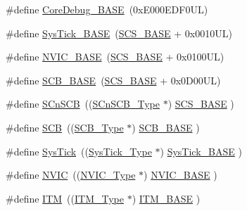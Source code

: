\begin{DoxyCompactItemize}
\item 
\#define \hyperlink{group___c_m_s_i_s__core__base_ga680604dbcda9e9b31a1639fcffe5230b}{Core\+Debug\+\_\+\+B\+A\+SE}~(0x\+E000\+E\+D\+F0\+U\+L)
\item 
\#define \hyperlink{group___c_m_s_i_s__core__base_ga58effaac0b93006b756d33209e814646}{Sys\+Tick\+\_\+\+B\+A\+SE}~(\hyperlink{group___c_m_s_i_s__core__base_ga3c14ed93192c8d9143322bbf77ebf770}{S\+C\+S\+\_\+\+B\+A\+SE} +  0x0010\+U\+L)
\item 
\#define \hyperlink{group___c_m_s_i_s__core__base_gaa0288691785a5f868238e0468b39523d}{N\+V\+I\+C\+\_\+\+B\+A\+SE}~(\hyperlink{group___c_m_s_i_s__core__base_ga3c14ed93192c8d9143322bbf77ebf770}{S\+C\+S\+\_\+\+B\+A\+SE} +  0x0100\+U\+L)
\item 
\#define \hyperlink{group___c_m_s_i_s__core__base_gad55a7ddb8d4b2398b0c1cfec76c0d9fd}{S\+C\+B\+\_\+\+B\+A\+SE}~(\hyperlink{group___c_m_s_i_s__core__base_ga3c14ed93192c8d9143322bbf77ebf770}{S\+C\+S\+\_\+\+B\+A\+SE} +  0x0\+D00\+U\+L)
\item 
\#define \hyperlink{group___c_m_s_i_s__core__base_ga9fe0cd2eef83a8adad94490d9ecca63f}{S\+Cn\+S\+CB}~((\hyperlink{struct_s_cn_s_c_b___type}{S\+Cn\+S\+C\+B\+\_\+\+Type}    $\ast$)     \hyperlink{group___c_m_s_i_s__core__base_ga3c14ed93192c8d9143322bbf77ebf770}{S\+C\+S\+\_\+\+B\+A\+SE}      )
\item 
\#define \hyperlink{group___c_m_s_i_s__core__base_gaaaf6477c2bde2f00f99e3c2fd1060b01}{S\+CB}~((\hyperlink{struct_s_c_b___type}{S\+C\+B\+\_\+\+Type}       $\ast$)     \hyperlink{group___c_m_s_i_s__core__base_gad55a7ddb8d4b2398b0c1cfec76c0d9fd}{S\+C\+B\+\_\+\+B\+A\+SE}      )
\item 
\#define \hyperlink{group___c_m_s_i_s__core__base_gacd96c53beeaff8f603fcda425eb295de}{Sys\+Tick}~((\hyperlink{struct_sys_tick___type}{Sys\+Tick\+\_\+\+Type}   $\ast$)     \hyperlink{group___c_m_s_i_s__core__base_ga58effaac0b93006b756d33209e814646}{Sys\+Tick\+\_\+\+B\+A\+SE}  )
\item 
\#define \hyperlink{group___c_m_s_i_s__core__base_gac8e97e8ce56ae9f57da1363a937f8a17}{N\+V\+IC}~((\hyperlink{struct_n_v_i_c___type}{N\+V\+I\+C\+\_\+\+Type}      $\ast$)     \hyperlink{group___c_m_s_i_s__core__base_gaa0288691785a5f868238e0468b39523d}{N\+V\+I\+C\+\_\+\+B\+A\+SE}     )
\item 
\#define \hyperlink{group___c_m_s_i_s__core__base_gabae7cdf882def602cb787bb039ff6a43}{I\+TM}~((\hyperlink{struct_i_t_m___type}{I\+T\+M\+\_\+\+Type}       $\ast$)     \hyperlink{group___c_m_s_i_s__core__base_gadd76251e412a195ec0a8f47227a8359e}{I\+T\+M\+\_\+\+B\+A\+SE}      )

\end{DoxyCompactItemize}
